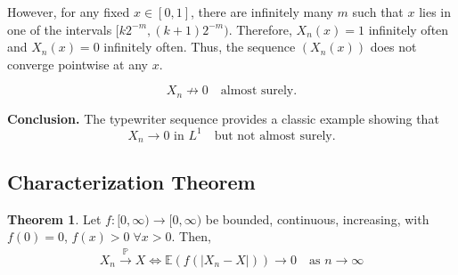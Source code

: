 \documentclass[11pt,a4paper]{article}
\theoremstyle{definition}
\newtheorem{theorem}{Theorem}[section]
\begin{document}
\medskip

\noindent
However, for any fixed $x \in [0,1]$, there are infinitely many $m$ such that $x$ lies in one of the intervals 
$[k2^{-m}, (k+1)2^{-m})$.  
Therefore, $X_n(x) = 1$ infinitely often and $X_n(x) = 0$ infinitely often.  
Thus, the sequence $(X_n(x))$ does not converge pointwise at any $x$.

\[
X_n \not\to 0 \quad \text{almost surely.}
\]

\medskip

\noindent
\textbf{Conclusion.}  
The typewriter sequence provides a classic example showing that
\[
X_n \to 0 \text{ in } L^1 \quad \text{but not almost surely.}
\]
\subsection{Characterization Theorem}
\begin{theorem} \label{thm:charact}
Let $f: [0,\infty)\to[0,\infty)$ be bounded, continuous, increasing, with $f(0)=0$, $f(x) > 0\; \forall x>0$. Then,
\begin{align*}
X_n \xrightarrow{\mathbb{P}} X \iff \mathbb{E} (f(|X_n - X|)) \to 0\quad \text{as $n\to\infty$}
\end{align*}
\end{theorem}
\end{document}
